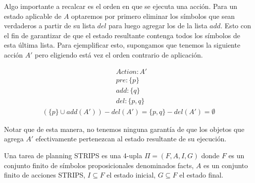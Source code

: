 Algo importante a recalcar es el orden en que se ejecuta una acción. Para un estado aplicable de $A$ optaremos por primero eliminar los símbolos que sean verdaderos a partir de su lista $del$ para luego agregar los de la lista $add$. Esto con el fin de garantizar de que el estado resultante contenga todos los símbolos de esta última lista.
Para ejemplificar esto, supongamos que tenemos la siguiente acción $A'$ pero eligiendo está vez el orden contrario de aplicación.

\begin{align*}
    & Action : A' \\
    & pre : \{ p \}\\
    & add : \{ q \}\\
    & del : \{ p, q \}
\end{align*}
\begin{align*}
    (\{p\} \cup add(A')) - del(A') = \{p, q\} - del(A') = \emptyset
\end{align*}

Notar que de esta manera, no tenemos ninguna garantía de que los objetos que agrega $A'$ efectivamente pertenezcan
al estado resultante de su ejecución.

\begin{mydef}
    Una tarea de planning STRIPS es una 4-upla $\Pi = (F, A, I, G)$ donde $F$ es
    un conjunto finito de símbolos proposicionales denominados facts, $A$ es un
    conjunto finito de acciones STRIPS, $I \subseteq F$ el estado inicial, $G
    \subseteq F$ el estado final.
\end{mydef}


